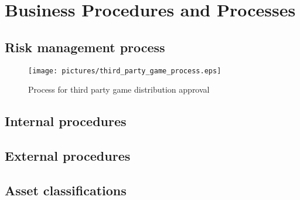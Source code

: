\section{Business Procedures and Processes}

\subsection{Risk management process}

\begin{figure}[h]\centering
\texttt{[image: pictures/third\_party\_game\_process.eps]}
\caption{Process for third party game distribution approval}
\label{fig:proc_third_party}
\end{figure}

\subsection{Internal procedures}

\subsection{External procedures}

\subsection{Asset classifications}